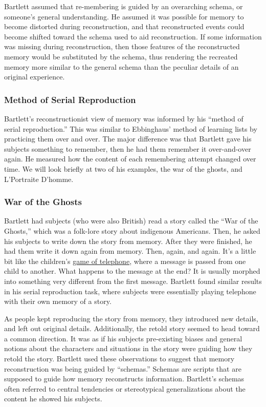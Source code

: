 \documentclass[
  oneside,
  12pt]{crumpbook}
\begin{document}
Bartlett assumed that re-membering is guided by an overarching schema, or someone's general understanding. He assumed it was possible for memory to become distorted during reconstruction, and that reconstructed events could become shifted toward the schema used to aid reconstruction. If some information was missing during reconstruction, then those features of the reconstructed memory would be substituted by the schema, thus rendering the recreated memory more similar to the general schema than the peculiar details of an original experience.

\hypertarget{method-of-serial-reproduction}{%
\subsubsection{Method of Serial Reproduction}\label{method-of-serial-reproduction}}

Bartlett's reconstructionist view of memory was informed by his ``method of serial reproduction.'' This was similar to Ebbinghaus' method of learning lists by practicing them over and over. The major difference was that Bartlett gave his subjects something to remember, then he had them remember it over-and-over again. He measured how the content of each remembering attempt changed over time. We will look briefly at two of his examples, the war of the ghosts, and L'Portraite D'homme.

\hypertarget{war-of-the-ghosts}{%
\subsubsection{War of the Ghosts}\label{war-of-the-ghosts}}

Bartlett had subjects (who were also British) read a story called the ``War of the Ghosts,'' which was a folk-lore story about indigenous Americans. Then, he asked his subjects to write down the story from memory. After they were finished, he had them write it down again from memory. Then, again, and again. It's a little bit like the children's \href{https://en.wikipedia.org/wiki/Chinese_whispers}{game of telephone}, where a message is passed from one child to another. What happens to the message at the end? It is usually morphed into something very different from the first message. Bartlett found similar results in his serial reproduction task, where subjects were essentially playing telephone with their own memory of a story.

As people kept reproducing the story from memory, they introduced new details, and left out original details. Additionally, the retold story seemed to head toward a common direction. It was as if his subjects pre-existing biases and general notions about the characters and situations in the story were guiding how they retold the story. Bartlett used these observations to suggest that memory reconstruction was being guided by ``schemas.'' Schemas are scripts that are supposed to guide how memory reconstructs information. Bartlett's schemas often referred to central tendencies or stereotypical generalizations about the content he showed his subjects.
\end{document}
